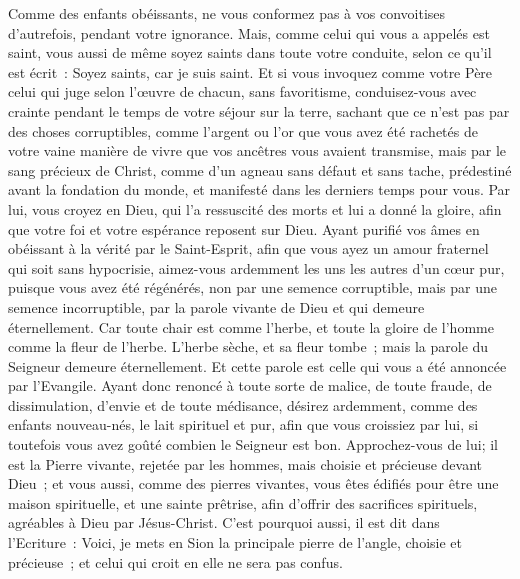 \begin{multicols}{2}
Comme des enfants obéissants, ne vous conformez pas à vos convoitises d'autrefois, pendant votre ignorance.
Mais, comme celui qui vous a appelés est saint, vous aussi de même soyez saints dans toute votre conduite,
selon ce qu'il est écrit~: Soyez saints, car je suis saint.
Et si vous invoquez comme votre Père celui qui juge selon l'œuvre de chacun, sans favoritisme, conduisez-vous avec crainte pendant le temps de votre séjour sur la terre,
sachant que ce n’est pas par des choses corruptibles, comme l’argent ou l’or que vous avez été rachetés de votre vaine manière de vivre que vos ancêtres vous avaient transmise,
mais par le sang précieux de Christ, comme d'un agneau sans défaut et sans tache,
prédestiné avant la fondation du monde, et manifesté dans les derniers temps pour vous.
Par lui, vous croyez en Dieu, qui l'a ressuscité des morts et lui a donné la gloire, afin que votre foi et votre espérance reposent sur Dieu.
Ayant purifié vos âmes en obéissant à la vérité par le Saint-Esprit, afin que vous ayez un amour fraternel qui soit sans hypocrisie, aimez-vous ardemment les uns les autres d'un cœur pur,
puisque vous avez été régénérés, non par une semence corruptible, mais par une semence incorruptible, par la parole vivante de Dieu et qui demeure éternellement.
Car toute chair est comme l'herbe, et toute la gloire de l'homme comme la fleur de l'herbe. L'herbe sèche, et sa fleur tombe~;
mais la parole du Seigneur demeure éternellement. Et cette parole est celle qui vous a été annoncée par l'Evangile.
\VerseOne{}Ayant donc renoncé à toute sorte de malice, de toute fraude, de dissimulation, d'envie et de toute médisance,
désirez ardemment, comme des enfants nouveau-nés, le lait spirituel et pur, afin que vous croissiez par lui,
si toutefois vous avez goûté combien le Seigneur est bon.
Approchez-vous de lui; il est la Pierre vivante, rejetée par les hommes, mais choisie et précieuse devant Dieu~;
et vous aussi, comme des pierres vivantes, vous êtes édifiés pour être une maison spirituelle, et une sainte prêtrise, afin d'offrir des sacrifices spirituels, agréables à Dieu par Jésus-Christ.
C'est pourquoi aussi, il est dit dans l'Ecriture~: Voici, je mets en Sion la principale pierre de l'angle, choisie et précieuse~; et celui qui croit en elle ne sera pas confus.

\end{multicols}
